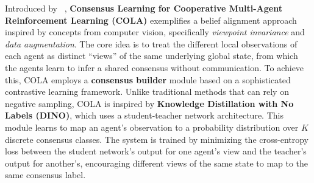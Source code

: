
Introduced by ~\parencite{COLA}, \textbf{Consensus Learning for Cooperative Multi-Agent Reinforcement Learning (COLA)} exemplifies a belief alignment approach inspired by concepts from computer vision, specifically \textit{viewpoint invariance} and \textit{data augmentation}. The core idea is to treat the different local observations of each agent as distinct ``views'' of the same underlying global state, from which the agents learn to infer a shared consensus without communication. To achieve this, COLA employs a \textbf{consensus builder} module based on a sophisticated contrastive learning framework. Unlike traditional methods that can rely on negative sampling, COLA is inspired by \textbf{Knowledge Distillation with No Labels (DINO)}, which uses a student-teacher network architecture. This module learns to map an agent's observation to a probability distribution over $K$ discrete consensus classes. The system is trained by minimizing the cross-entropy loss between the student network's output for one agent's view and the teacher's output for another's, encouraging different views of the same state to map to the same consensus label.

